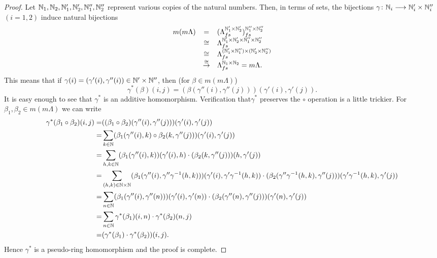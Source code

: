 \begin{proof}
Let $\mathbb{N}_1,\mathbb{N}_2,\mathbb{N}'_1,\mathbb{N}'_2,\mathbb{N}''_1,\mathbb{N}''_2$ represent various copies of the natural numbers. Then, in terms of sets, the bijections $\gamma\colon   \mathbb{N}_i \longrightarrow \mathbb{N}'_i\times \mathbb{N}''_i$ $(i=1,2)$ induce natural bijections
\begin{equation*}
\begin{array}{rcl}
m(m\Lambda)& = &(\Lambda_{fs}^{\mathbb{N}'_1\times \mathbb{N}'_2})_{fs}^{\mathbb{N}''_1\times \mathbb{N}''_2} \\
 & \cong & \Lambda_{fs}^{\mathbb{N}'_1\times \mathbb{N}'_2\times \mathbb{N}''_1\times \mathbb{N}''_2}\\
& \cong &\Lambda_{fs}^{(\mathbb{N}'_1\times \mathbb{N}''_1)\times (\mathbb{N}'_2\times \mathbb{N}''_2)} \\
&\overset{\cong}{\to} &\Lambda_{fs}^{\mathbb{N}_1\times \mathbb{N}_2}=m\Lambda.
\end{array}
\end{equation*}
This means that if $\gamma(i)=(\gamma'(i),\gamma''(i))\in \mathbb{N}'\times \mathbb{N}''$, then (for $\beta\in m(m\Lambda)$)
\[\gamma^*(\beta)(i,j)=(\beta(\gamma''(i),\gamma''(j)))(\gamma'(i),\gamma'(j)).\]
It is easy enough to see that $\gamma^*$ is an additive homomorphism. Verification  that$\gamma^*$ preserves the $\circ$ operation is a little trickier. For $\beta_1,\beta_2\in m(m\Lambda)$ we can write
\begin{align*}
\gamma^*(\beta_1\circ \beta_2)(i,j)=&((\beta_1\circ \beta_2)(\gamma''(i),\gamma''(j)))(\gamma'(i),\gamma'(j))\\
=&\sum_{k\in \mathbb{N}}(\beta_1(\gamma''(i),k)\circ \beta_2(k,\gamma''(j)))(\gamma'(i),\gamma'(j))\\
=&\sum_{h,k\in \mathbb{N}}(\beta_1(\gamma''(i),k))(\gamma'(i),h)\cdot (\beta_2(k,\gamma''(j)))(h,\gamma'(j))\\
=&\sum_{(h,k)\in \mathbb{N}\times \mathbb{N}}(\beta_1(\gamma''(i),\gamma''\gamma^{-1}(h,k)))(\gamma'(i),\gamma'\gamma^{-1}(h,k))\cdot (\beta_2(\gamma''\gamma^{-1}(h,k),\gamma''(j)))(\gamma'\gamma^{-1}(h,k),\gamma'(j))\\
=&\sum_{n\in \mathbb{N}}(\beta_1(\gamma''(i),\gamma''(n)))(\gamma'(i),\gamma'(n))\cdot (\beta_2(\gamma''(n),\gamma''(j)))(\gamma'(n),\gamma'(j))\\
=&\sum_{n\in \mathbb{N}}\gamma^*(\beta_1)(i,n)\cdot \gamma^*(\beta_2)(n,j)\\
=&(\gamma^*(\beta_1)\cdot \gamma^*(\beta_2))(i,j).
\end{align*}
Hence $\gamma^*$ is a pseudo-ring homomorphism and the proof is complete.

\end{proof}

